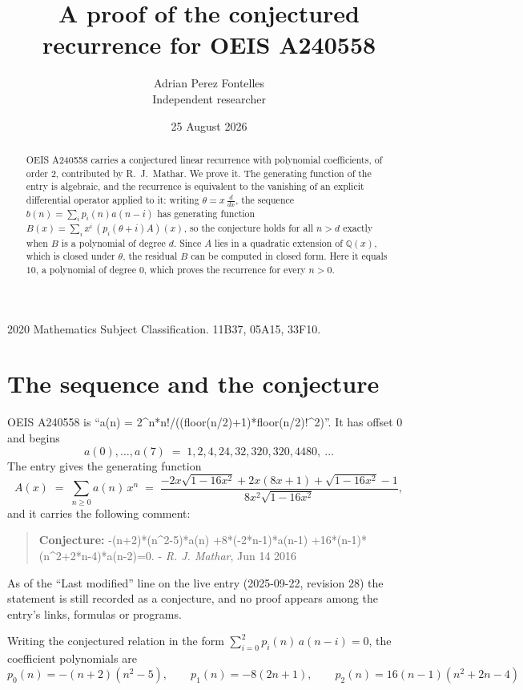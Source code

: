 \documentclass[11pt,a4paper]{article}
\title{A proof of the conjectured recurrence for OEIS A240558}
\author{Adrian Perez Fontelles\\ \small Independent researcher}
\date{25 August 2026}
\theoremstyle{plain}
\theoremstyle{definition}
\begin{document}
\maketitle

\begin{abstract}
OEIS A240558 carries a conjectured linear recurrence with polynomial coefficients, of
order 2, contributed by R.~J.~Mathar. We prove it. The generating function of the
entry is algebraic, and the recurrence is equivalent to the vanishing of an explicit
differential operator applied to it: writing $\theta=x\,\frac{d}{dx}$, the sequence
$b(n)=\sum_{i}p_{i}(n)a(n-i)$ has generating function
$B(x)=\sum_{i}x^{i}\,(p_{i}(\theta+i)A)(x)$, so the conjecture holds for all $n>d$ exactly
when $B$ is a polynomial of degree $d$. Since $A$ lies in a quadratic extension of
$\mathbb{Q}(x)$, which is closed under $\theta$, the residual $B$ can be computed in
closed form. Here it equals $10$, a polynomial of degree $0$, which proves
the recurrence for every $n>0$.
\end{abstract}

\noindent\small 2020 Mathematics Subject Classification. 11B37, 05A15, 33F10.\normalsize

\section{The sequence and the conjecture}

OEIS A240558 is ``a(n) = 2\^{}n*n!/((floor(n/2)+1)*floor(n/2)!\^{}2)''. It has offset $0$ and begins
\[
a(0),\dots,a(7)\;=\;1, 2, 4, 24, 32, 320, 320, 4480,\ \dots
\]
The entry gives the generating function
\begin{equation}\label{eq:gf}
A(x)\;=\;\sum_{n\ge 0} a(n)\,x^{n}\;=\;\frac{- 2 x \sqrt{1 - 16 x^{2}} + 2 x \left(8 x + 1\right) + \sqrt{1 - 16 x^{2}} - 1}{8 x^{2} \sqrt{1 - 16 x^{2}}} ,
\end{equation}
and it carries the following comment:
\begin{quote}\small
\textbf{Conjecture:} -(n+2)*(n\^{}2-5)*a(n) +8*(-2*n-1)*a(n-1) +16*(n-1)*(n\^{}2+2*n-4)*a(n-2)=0. - \emph{R. J. Mathar}, Jun 14 2016
\end{quote}
As of the ``Last modified'' line on the live entry (2025-09-22, revision 28) the
statement is still recorded as a conjecture, and no proof appears among the entry's links,
formulas or programs.

Writing the conjectured relation in the form $\sum_{i=0}^{2}p_{i}(n)\,a(n-i)=0$,
the coefficient polynomials are
\[
p_{0}(n)=- \left(n + 2\right) \left(n^{2} - 5\right),\qquad p_{1}(n)=- 8 \left(2 n + 1\right),\qquad p_{2}(n)=16 \left(n - 1\right) \left(n^{2} + 2 n - 4\right)
\]
\end{document}
